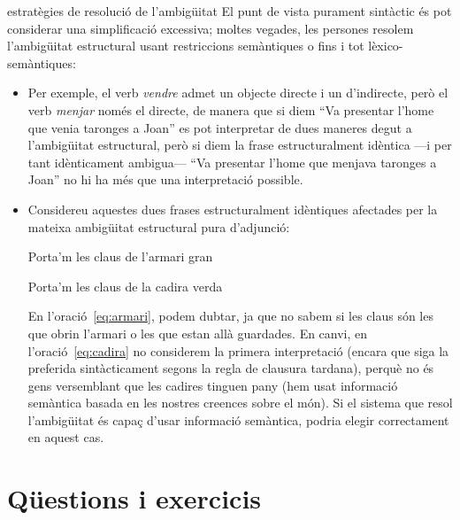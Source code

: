 \begin{persabermes}{estratègies de resolució de l'ambigüitat}
  El punt de vista purament sintàctic és pot considerar una
  simplificació excessiva; moltes vegades, les persones resolem
  l'ambigüitat estructural usant restriccions semàntiques o fins i tot
  lèxico-semàntiques:
  \begin{itemize}
  \item Per exemple, el verb \emph{vendre} admet un objecte directe i
    un d'indirecte, però el verb \emph{menjar} només el directe, de
    manera que si diem ``Va presentar l'home que venia taronges a
    Joan'' es pot interpretar de dues maneres degut a l'ambigüitat
    estructural, però si diem la frase estructuralment idèntica ---i
    per tant idènticament ambigua--- ``Va presentar l'home que menjava
    taronges a Joan'' no hi ha més que una interpretació possible.
  \item Considereu aquestes dues frases estructuralment idèntiques
    afectades per la mateixa ambigüitat estructural pura d'adjunció:
    \begin{exemple}
      \label{eq:armari}
      Porta'm les claus de l'armari gran
    \end{exemple}
    \begin{exemple}
      \label{eq:cadira}
      Porta'm les claus de la cadira verda
    \end{exemple}
    En l'oració~\ref{eq:armari}, podem dubtar, ja que no sabem si les
    claus són les que obrin l'armari o les que estan allà
    guardades. En canvi, en l'oració~\ref{eq:cadira} no considerem la
    primera interpretació (encara que siga la preferida sintàcticament
    segons la regla de clausura tardana), perquè no és gens
    versemblant que les cadires tinguen pany (hem usat informació
    semàntica basada en les nostres creences sobre el món). Si el
    sistema que resol l'ambigüitat és capaç d'usar informació
    semàntica, podria elegir correctament en aquest cas.
  \end{itemize}
\end{persabermes}


\section{Qüestions i exercicis}


